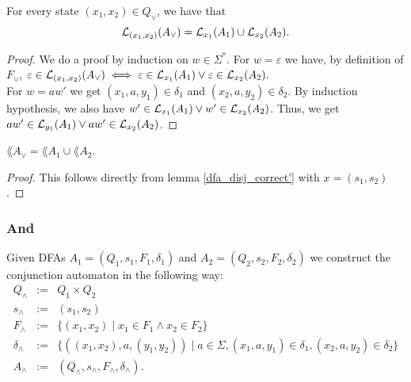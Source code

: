 \begin{lemma}
    \label{dfa_disj_correct'}
    For every state $(x_1, x_2) \in Q_\vee$, we have that
    \begin{equation*}
        \mathcal{L}_{(x_1, x_2)}(A_\vee) = \mathcal{L}_{x_1}(A_1) \cup \mathcal{L}_{x_2}(A_2).
    \end{equation*}
\end{lemma}
\begin{proof}
    We do a proof by induction on $w \in \Sigma^*$.
    For $w = \varepsilon$ we have, by definition of $F_\vee$, 
    $%
    \varepsilon \in \acc{(x_1, x_2)}{A_\vee} 
    \iff \varepsilon \in \acc{x_1}{A_1} \vee \varepsilon \in \acc{x_2}{A_2}.
    $%
    \\
    For $w = aw'$ we get $(x_1, a, y_1) \in \delta_1$ and $(x_2, a, y_2) \in \delta_2$.
    By induction hypothesis, we also have $w' \in \mathcal{L}_{x_1}(A_1) \vee w' \in \mathcal{L}_{x_2}(A_2)$.
    Thus, we get $aw' \in \mathcal{L}_{y_1}(A_1) \vee aw' \in \mathcal{L}_{x_2}(A_2)$.
\end{proof}

\begin{lemma}
    $\lang{A_\vee} = \lang{A_1} \cup \lang{A_2}$.
    \label{dfa_disj_correct}
\end{lemma}
\begin{proof}
    This follows directly from lemma \ref{dfa_disj_correct'} with $x = (s_1, s_2)$.
\end{proof}




\subsubsection{And}
\begin{definition}
    Given DFAs 
    $A_1=(Q_1, s_1, F_1, \delta_1)$ and $A_2=(Q_2, s_2, F_2, \delta_2)$ 
    we construct the conjunction automaton  in the following way:
    \begin{eqnarray*}
        Q_\wedge &:=& Q_1 \times Q_2 \\
        s_\wedge &:=& (s_1, s_2) \\
        F_\wedge &:=& \{(x_1,x_2) \; | \; x_1 \in F_1 \wedge x_2 \in F_2\} \\
        \delta_\wedge &:=& \{( (x_1, x_2),a,(y_1, y_2)) \; | \; a \in \Sigma, (x_1, a, y_1) \in \delta_1, (x_2, a, y_2) \in \delta_2 \} \\
        A_\wedge &:=& (Q_\wedge, s_\wedge, F_\wedge, \delta_\wedge).
    \end{eqnarray*}
\end{definition}

